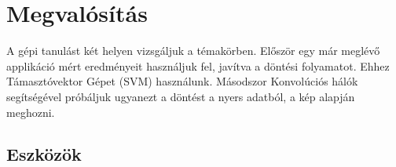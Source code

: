 %
%
%
%
%
%
%
%
%
%




\newpage
\section{Megvalósítás}

A gépi tanulást két helyen vizsgáljuk a témakörben.
Először egy már meglévő applikáció mért eredményeit használjuk fel,
javítva a döntési folyamatot. Ehhez Támasztóvektor Gépet (SVM) használunk.
Másodszor Konvolúciós hálók segítségével próbáljuk ugyanezt a döntést 
a nyers adatból, a kép alapján meghozni. 

\subsection{Eszközök}

